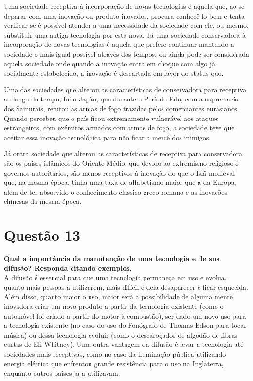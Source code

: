 Uma sociedade receptiva à incorporação de novas tecnologias é aquela que, ao se deparar com uma inovação ou produto inovador, procura conhecê-lo bem e tenta verificar se é possível atender a uma necessidade da sociedade com ele, ou mesmo, substituir uma antiga tecnologia por esta nova. Já uma sociedade conservadora à incorporação de novas tecnologias é aquela que prefere continuar mantendo a sociedade o mais igual possível através dos tempos, ou ainda pode ser considerada aquela sociedade onde quando a inovação entra em choque com algo já socialmente estabelecido, a inovação é descartada em favor do status-quo.

Uma das sociedades que alterou as características de conservadora para receptiva ao longo do tempo, foi o Japão, que durante o Período Edo, com a supremacia dos Samurais, refutou as armas de fogo trazidas pelos comerciantes eurasianos. Quando percebeu que o país ficou extremamente vulnerável aos ataques estrangeiros, com exércitos armados com armas de fogo, a sociedade teve que aceitar essa inovação tecnológica para não ficar a mercê dos inimigos.

Já outra sociedade que alterou as características de receptiva para conservadora são os países islâmicos do Oriente Médio, que devido ao extremismo religioso e governos autoritários, são menos receptivos à inovação do que o Islã medieval que, na mesma época, tinha uma taxa de alfabetismo maior que a da Europa, além de ter absorvido o conhecimento clássico greco-romano e as inovações chinesas da mesma época.


\section{Questão 13}
\label{sec:q13}
\textbf{Qual a importância da manutenção de uma tecnologia e de sua difusão? Responda citando exemplos.} \\

A difusão é essencial para que uma tecnologia permaneça em uso e evolua, quanto mais pessoas a utilizarem, mais difícil é dela desaparecer e ficar esquecida. Além disso, quanto maior o uso, maior será a possibilidade de alguma mente inovadora criar um novo produto a partir da tecnologia existente (como o automóvel foi criado a partir do motor à combustão), ser dado um novo uso para a tecnologia existente (no caso do uso do Fonógrafo de Thomas Edson para tocar música) ou dessa tecnologia evoluir (como o descaroçador de algodão de fibras curtas de Eli Whitncy). Uma outra vantagem da difusão é levar a tecnologia até sociedades mais receptivas, como no caso da iluminação pública utilizando energia elétrica que enfrentou grande resistência para o uso na Inglaterra, enquanto outros países já a utilizavam.

